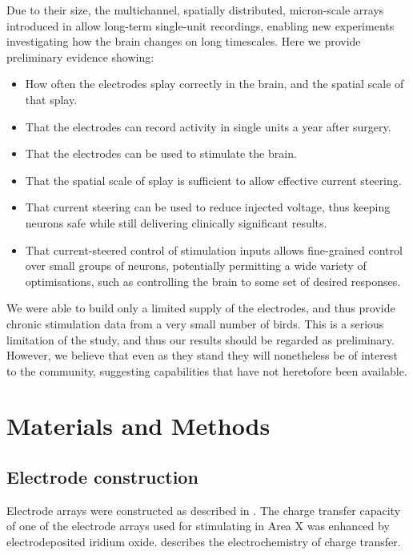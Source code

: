 \documentclass[10pt,letterpaper]{article}
\begin{document}
Due to their size, the multichannel, spatially distributed,
micron-scale arrays introduced in \cite{Guitchounts2013electrode}
allow long-term single-unit recordings, enabling new experiments
investigating how the brain changes on long timescales. Here we
provide preliminary evidence showing:
\begin{itemize}
\item How often the electrodes splay correctly in the brain, and the spatial scale of that splay.
\item That the electrodes can record activity in single units a year after surgery.
\item That the electrodes can be used to stimulate the brain.
\item That the spatial scale of splay is sufficient to allow effective current steering.
  \item That current steering can be used to reduce injected voltage, thus keeping neurons safe while still delivering clinically significant results.
\item That current-steered control of stimulation inputs allows
fine-grained control over small groups of neurons, potentially
permitting a wide variety of optimisations, such as controlling the
brain to some set of desired responses.
\end{itemize}

We were able to build only a limited supply of the electrodes, and
thus provide chronic stimulation data from a very small number of
birds. This is a serious limitation of the study, and thus our results
should be regarded as preliminary. However, we believe that even as
they stand they will nonetheless be of interest to the community,
suggesting capabilities that have not heretofore been available.




\section{Materials and Methods}

\subsection{Electrode construction}

Electrode arrays were constructed as described in
\cite{Guitchounts2013electrode}.  The charge transfer capacity of one
of the electrode arrays used for stimulating in Area X was enhanced by
electrodeposited iridium oxide.  \cite{Cogan2008electrodes} describes
the electrochemistry of charge transfer.
\end{document}
